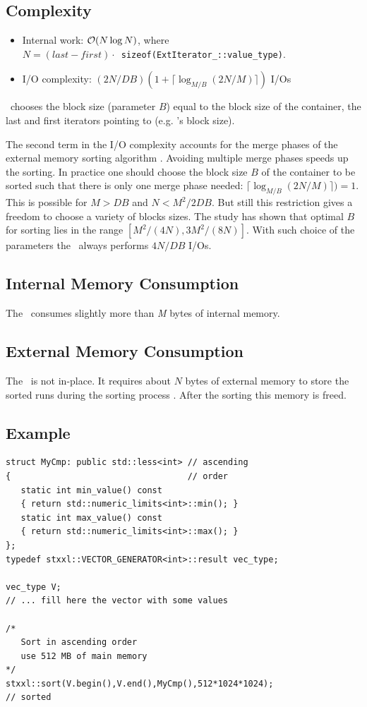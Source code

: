 \documentclass[twoside]{book}
\begin{document}
\subsection*{Complexity}
\label{sortcomplexity}
\begin{itemize}
\item Internal work: $\mathcal{O}\!\left( N \log N\right)$, where \\$N = (last -
first)\cdot$~\texttt{sizeof(ExtIterator\_::value\_type)}.
\item I/O complexity: $(2N/DB)(1 + \lceil {\log}_{M/B}(2N/M) \rceil)$ I/Os
\end{itemize}

\xsort\ chooses the block size (parameter $B$) equal to the block size
of the container, the last and first iterators pointing to
(e.g. \xvector 's block size).

The second term in the I/O complexity accounts for the merge phases of
the external memory sorting algorithm \cite{DemSan03}. Avoiding
multiple merge phases  
speeds up the sorting. In practice one should choose the block size
$B$ of the container to be 
sorted such that there is only one merge phase needed: $\lceil
{\log}_{M/B}(2N/M) \rceil) = 1$. This is 
possible for $M > DB$ and $N < M^2/2DB$. But still this restriction
gives a freedom to choose a variety of blocks sizes. The study
\cite{DemSan03} has shown that optimal $B$ for sorting lies in the
range $[M^2/(4N),3M^2/(8N)]$. With such choice of the parameters the
\xsort\ always performs $4N/DB$ I/Os.

\subsection*{Internal Memory Consumption}
\label{sortimem}
The \xsort\ consumes slightly more than \emph{M} bytes of internal
memory. 

\subsection*{External Memory Consumption}
\label{sortemem}
The \xsort\ is not in-place. It requires about $N$ bytes of external
memory to store the sorted runs during the sorting process
\cite{DemSan03}. After the sorting this memory is freed.

\subsection*{Example}
\begin{lstlisting}
struct MyCmp: public std::less<int> // ascending
{                                   // order
   static int min_value() const  
   { return std::numeric_limits<int>::min(); }
   static int max_value() const  
   { return std::numeric_limits<int>::max(); }
};
typedef stxxl::VECTOR_GENERATOR<int>::result vec_type;

vec_type V;
// ... fill here the vector with some values

/*
   Sort in ascending order
   use 512 MB of main memory
*/
stxxl::sort(V.begin(),V.end(),MyCmp(),512*1024*1024);
// sorted
\end{lstlisting}
\end{document}
